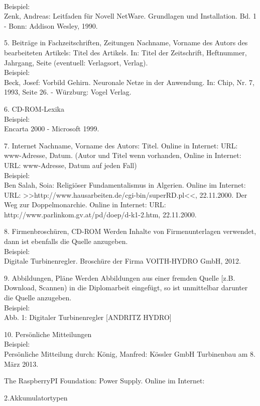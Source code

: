 \documentclass[12pt,a4paper]{article}
\begin{document}
{{{\begin{description*}
		\\[1mm]Beispiel:
		\\Zenk, Andreas: Leitfaden für Novell NetWare. Grundlagen und Installation. Bd. 1 - Bonn:
		Addison Wesley, 1990.
		\vspace*{2mm}
	\item[5. Beiträge in Fachzeitschriften, Zeitungen] Nachname, Vorname des Autors des bearbeiteten
		Artikels: Titel des Artikels. In: Titel der Zeitschrift, Heftnummer, Jahrgang, Seite
		(eventuell: Verlagsort, Verlag).
		\\[1mm]Beispiel:
		\\Beck, Josef: Vorbild Gehirn. Neuronale Netze in der Anwendung. In: Chip, Nr. 7, 1993,
		Seite 26. - Würzburg: Vogel Verlag.
		\vspace*{2mm}
	\item[6. CD-ROM-Lexika]\hfill
		\\[1mm]Beispiel:
		\\Encarta 2000 - Microsoft 1999.
		\vspace*{2mm}
	\item[7. Internet] Nachname, Vorname des Autors: Titel. Online in Internet: URL: www-Adresse, Datum.
		(Autor und Titel wenn vorhanden, Online in Internet: URL: www-Adresse, Datum auf
		jeden Fall)
		\\[1mm]Beispiel:
		\\Ben Salah, Soia: Religiöser Fundamentalismus in Algerien. Online im Internet:
		URL: >>http:/\slash{}www.hausarbeiten.de\slash{}cgi-bin\slash{}superRD.pl<<,
		22.11.2000. Der Weg zur Doppelmonarchie.
		Online in Internet: URL:
		http:/\slash{}www.parlinkom.gv.at\slash{}pd\slash{}doep\slash{}d-k1-2.htm,
		22.11.2000.
		\vspace*{2mm}
	\item[8. Firmenbroschüren, CD-ROM] Werden Inhalte von Firmenunterlagen verwendet,
		dann ist ebenfalls die Quelle anzugeben.
		\\[1mm]Beispiel:
		\\Digitale Turbinenregler. Broschüre der Firma VOITH-HYDRO GmbH, 2012.
		\vspace*{2mm}
	\item[9. Abbildungen, Pläne] Werden Abbildungen aus einer fremden Quelle
		[z.B. Download, Scannen) in die Diplomarbeit eingefügt,
		so ist unmittelbar darunter die Quelle anzugeben.
		\\[1mm]Beispiel:
		\\Abb. 1: Digitaler Turbinenregler [ANDRITZ HYDRO]
		\vspace*{2mm}
	\item[10. Persönliche Mitteilungen]\hfill
		\\[1mm]Beispiel:
		\\Persönliche Mitteilung durch: König, Manfred:
		Kössler GmbH Turbinenbau am 8. März 2013.
	\item[]{The RaspberryPI Foundation: Power Supply. Online im Internet: }
	\item[2.Akkumulatortypen]{
 	}
	\end{description*}
	}}%
	}
\end{document}
